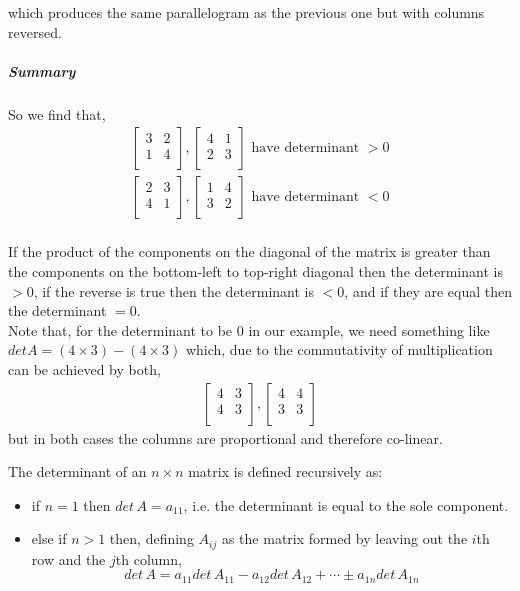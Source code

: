 \documentclass[../MathsNotesBase.tex]{subfiles}
\begin{document}
{		which produces the same parallelogram as the previous one but with columns reversed.
		\subparagraph{Summary} So we find that,
		\begin{align*}
		\begin{bmatrix}    
		3  &   2 \\
		1  &   4 \\		
		\end{bmatrix},
		\begin{bmatrix}    
		4  &   1 \\
		2  &   3 \\		
		\end{bmatrix}
		\text{ have determinant } > 0\\[10pt]
		\begin{bmatrix}    
		2  &   3 \\
		4  &   1 \\		
		\end{bmatrix},
		\begin{bmatrix}    
		1  &   4 \\
		3  &   2 \\		
		\end{bmatrix}
		\text{ have determinant } < 0\\[10pt]
		\end{align*}
		
		If the product of the components on the diagonal of the matrix is greater than the components on the bottom-left to top-right diagonal then the determinant is $> 0$, if the reverse is true then the determinant is $< 0$, and if they are equal then the determinant $= 0$.\\
		Note that, for the determinant to be $0$ in our example, we need something like $det A = (4 \times 3) - (4 \times 3)$ which, due to the commutativity of multiplication can be achieved by both,
		\begin{align*}
		\begin{bmatrix}    
		4  &   3 \\
		4  &   3 \\		
		\end{bmatrix},
		\begin{bmatrix}    
		4  &   4 \\
		3  &   3 \\		
		\end{bmatrix}
		\end{align*}
		but in both cases the columns are proportional and therefore co-linear.
		
		The determinant of an $n \times n$ matrix is defined recursively as:
		\begin{itemize}
		\item{if $n = 1$ then $det\, A = a_{11}$, i.e. the determinant is equal to the sole component.}
		\item{else if $n > 1$ then, defining $A_{ij}$ as the matrix formed by leaving out the $i$th row and the $j$th column,
				\[ det\, A = a_{11}det\, A_{11} - a_{12}det\, A_{12} + \cdots \pm a_{1n}det\, A_{1n} \]}
		\end{itemize}
		
}
\end{document}
